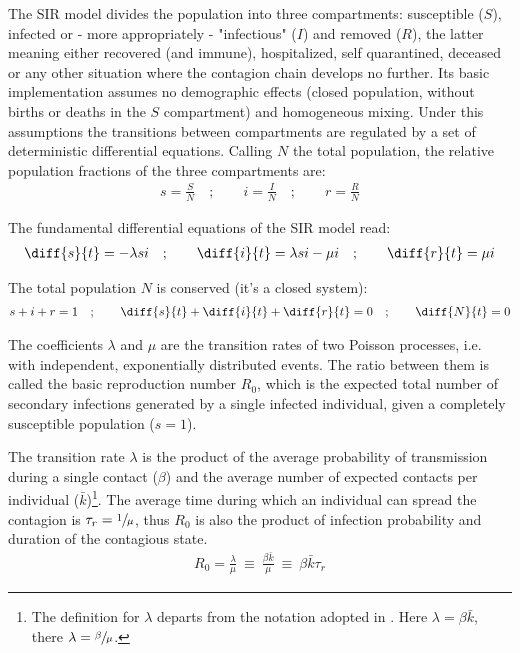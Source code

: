 \documentclass[DIV=12, BCOR=0pt]{scrartcl}  %
\begin{document}
  The SIR model divides the population into three compartments: susceptible ($S$), infected or - more appropriately - "infectious" ($I$) and removed ($R$), the latter meaning either recovered (and immune), hospitalized, self quarantined, deceased or any other situation where the contagion chain develops no further. Its basic implementation assumes no demographic effects (closed population, without births or deaths in the $S$ compartment) and homogeneous mixing. Under this assumptions the transitions between compartments are regulated by a set of deterministic differential equations. %
  Calling $N$ the total population, the relative population fractions of the three compartments are:
  \begin{align}
			s = \frac{S}{N}  \quad;  \qquad 	 i = \frac{I}{N}  \quad;  \qquad 	 r = \frac{R}{N}
  \end{align}

  The fundamental differential equations of the SIR model read:
  \begin{align}
  	\diff{s}{t} = - \lambda s i \quad;  \qquad 	\diff{i}{t} = \lambda s i - \mu i \quad; \qquad  \diff{r}{t} = \mu i
  	\label{eq:sir}
  \end{align}

  The total population $N$ is conserved (it's a closed system):  
  \begin{align}
  	s + i + r = 1 \quad ; \qquad \diff{s}{t} + \diff{i}{t} + \diff{r}{t} = 0  \quad ; \qquad  \diff{N}{t}= 0
  	\label{eq:sir_sum}
  \end{align}

	The coefficients $\lambda$ and $\mu$ are the transition rates of two Poisson processes, i.e. with independent, exponentially distributed events. The ratio between them is called the basic reproduction number $R_0$, which is the expected total number of secondary infections generated by a single infected individual, given a completely susceptible population ($s=1$). 
	
	The transition rate $\lambda$ is the product of the average probability of transmission during a single contact ($\beta$) and the average number of expected contacts per individual ($\bar{k}$)\footnote{The definition for $\lambda$ departs from the notation adopted in \citet{PastorSatorras}. Here $\lambda = \beta \bar{k}$, there $\lambda = \sfrac{\beta}{\mu}$.}.
  The average time during which an individual can spread the contagion is $\tau_{r} = \sfrac{1}{\mu}$, thus $R_0$ is also the product of infection probability and duration of the contagious state. 
  \begin{align}
			R_0 = \frac{\lambda}{\mu} \ \equiv \ \frac{\beta \bar{k}}{\mu} \ \equiv \ \beta \bar{k} \tau_{r}
			\label{eq:R0}
  \end{align}
\end{document}
